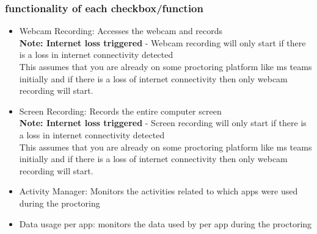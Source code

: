\documentclass{article}
\begin{document}
\subsubsection{functionality of each checkbox/function}
\begin{itemize}
    \item Webcam Recording: Accesses the webcam and records\\
    \textbf{Note: Internet loss triggered} - Webcam recording will only start if there is a loss in internet connectivity detected\\
    This assumes that you are already on some proctoring platform like ms teams initially and if there is a loss of internet connectivity then only webcam recording will start.\\
    \item Screen Recording: Records the entire computer screen\\
    \textbf{Note: Internet loss triggered} - Screen recording will only start if there is a loss in internet connectivity detected\\
    This assumes that you are already on some proctoring platform like ms teams initially and if there is a loss of internet connectivity then only webcam recording will start.\\
    \item Activity Manager: Monitors the activities related to which apps were used during the proctoring
    \item Data usage per app: monitors the data used by per app during the proctoring
\end{itemize}
\end{document}
